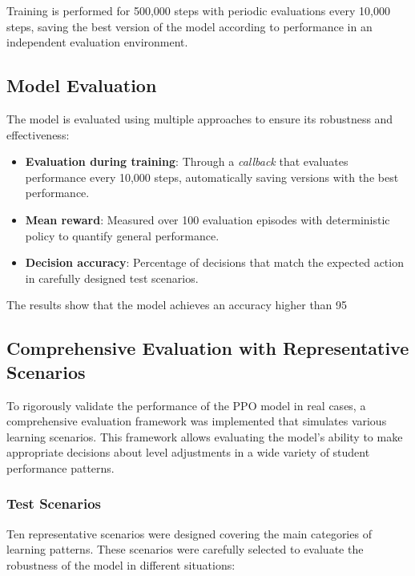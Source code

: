 Training is performed for 500,000 steps with periodic evaluations every 10,000 steps, saving the best version of the model according to performance in an independent evaluation environment.

\subsection{Model Evaluation}
\label{evaluacion-modelo-ppo}

The model is evaluated using multiple approaches to ensure its robustness and effectiveness:

\begin{itemize}
  \item \textbf{Evaluation during training}: Through a \textit{callback} that evaluates performance every 10,000 steps, automatically saving versions with the best performance.
  
  \item \textbf{Mean reward}: Measured over 100 evaluation episodes with deterministic policy to quantify general performance.
  
  \item \textbf{Decision accuracy}: Percentage of decisions that match the expected action in carefully designed test scenarios.
\end{itemize}

The results show that the model achieves an accuracy higher than 95%

\subsection{Comprehensive Evaluation with Representative Scenarios}
\label{evaluacion-exhaustiva-ppo}

To rigorously validate the performance of the PPO model in real cases, a comprehensive evaluation framework was implemented that simulates various learning scenarios. This framework allows evaluating the model's ability to make appropriate decisions about level adjustments in a wide variety of student performance patterns.

\subsubsection{Test Scenarios}

Ten representative scenarios were designed covering the main categories of learning patterns. These scenarios were carefully selected to evaluate the robustness of the model in different situations:

